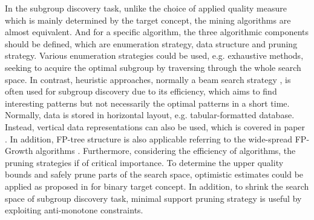 In the subgroup discovery task, unlike the choice of applied quality measure which is mainly determined by the target concept, the mining algorithms are almost equivalent. And for a specific algorithm, the three algorithmic components should be defined, which are enumeration strategy, data structure and pruning strategy. Various enumeration strategies could be used, e.g. exhaustive methods, seeking to acquire the optimal subgroup by traversing through the whole search space. In contrast, heuristic approaches, normally a beam search strategy \cite{clark1989cn2}, is often used for subgroup discovery due to its efficiency, which aims to find interesting patterns but not necessarily the optimal patterns in a short time. Normally, data is stored in horizontal layout, e.g. tabular-formatted database. Instead, vertical data representations can also be used, which is covered in paper \cite{zaki2000scalable}. In addition, FP-tree structure is also applicable referring to the wide-spread FP-Growth algorithms \cite{han2000mining}. Furthermore, considering the efficiency of algorithms, the pruning strategies if of critical importance. To determine the upper quality bounds and safely prune parts of the search space, optimistic estimates could be applied as proposed in \cite{wrobel1997algorithm} for binary target concept. In addition, to shrink the search space of subgroup discovery task, minimal support pruning strategy is useful by exploiting anti-monotone constraints. 



